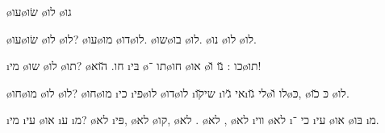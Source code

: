 \textheader%
{ \o{עו}\o{שׂו} \o{לו}}
{ \o{גו}}
{}
{}
{}
{}
{}

\begin{twocol}
\begin{stanza}
 \o{עו}\o{שׂו} \o{לו} \o{לו}?
 \o{עו}\o{מו}   \o{דו}\o{לו}.
 \o{שו}\o{בו}   \o{לו}.
\o{נו} \o{לו} \o{לו}.
\end{stanza}

\begin{stanza}
\i{מי} \o{שו}  \o{לו} \o{תו}?
  \o{חו}.
\u{הוא} \i{בּי} \o{תו}  ־\o{חו}
\o{או} \o{כו} : \u{נו} \u{ו}\o{תו}!
\end{stanza}

\begin{stanza}
 \o{חו}\o{מו} \o{לו} \o{לו}?
 \o{חו}\o{מו} \i{כי} \i{פי}\o{לו} \o{דו}\o{לו}
\i{שי}\u{קו} \i{אי} \u{ג׳ו}\i{לי} \u{גו}\o{לו}
\u{ו}\o{כּ}, \o{כּ} \u{כו} \o{לו}.
\end{stanza}

\begin{stanza}
\i{מי} \i{עי} \o{או} \i{ע}  \i{מ}?
\o{לא} \i{פּי}, \o{לא} \o{קו}, \o{לא} .
\o{לא} , \o{לא} \i{ווי} \o{לא} 
\i{כי} ־ 
\i{עי} \o{או} \o{בּו} \i{מ}.
\end{stanza}
\end{twocol}
